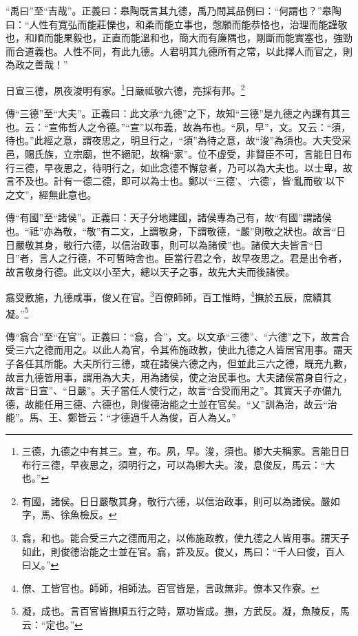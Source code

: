 {\noindent\shu{}\fzkt “禹曰”至“吉哉”。正義曰：皋陶既言其九德，禹乃問其品例曰：“何謂也？”皋陶曰：“人性有寬弘而能莊慄也，和柔而能立事也，愨願而能恭恪也，治理而能謹敬也，和順而能果毅也，正直而能溫和也，簡大而有廉隅也，剛斷而能實塞也，強勁而合道義也。人性不同，有此九德。人君明其九德所有之常，以此擇人而官之，則為政之善哉！” \par}

日宣三德，夙夜浚明有家。\footnote{三德，九德之中有其三。宣，布。夙，早。浚，須也。卿大夫稱家。言能日日布行三德，早夜思之，須明行之，可以為卿大夫。浚，息俊反，馬云：“大也。”}日嚴祗敬六德，亮採有邦。\footnote{有國，諸侯。日日嚴敬其身，敬行六德，以信治政事，則可以為諸侯。嚴如字，馬、徐魚檢反。}


{\noindent\zhuan{}\fzbyks 傳“三德”至“大夫”。正義曰：此文承“九德”之下，故知“三德”是九德之內課有其三也。云：“宣佈哲人之令德。”“宣”以布義，故為布也。“夙，早”，文。又云：“須，待也。”此經之意，謂夜思之，明旦行之，“須”為待之意，故“浚”為須也。大夫受采邑，賜氏族，立宗廟，世不絕祀，故稱“家”。位不虛受，非賢臣不可，言能日日布行三德，早夜思之，待明行之，如此念德不懈怠者，乃可以為大夫也。以士卑，故言不及也。計有一德二德，即可以為士也。鄭以“‘三德’、‘六德’，皆‘亂而敬’以下之文”，經無此意也。 \par}

{\noindent\zhuan{}\fzbyks 傳“有國”至“諸侯”。正義曰：天子分地建國，諸侯專為己有，故“有國”謂諸侯也。“祗”亦為敬，“敬”有二文，上謂敬身，下謂敬德，“嚴”則敬之狀也。故言“日日嚴敬其身，敬行六德，以信治政事，則可以為諸侯”也。諸侯大夫皆言“日日”者，言人之行德，不可暫時舍也。臣當行君之令，故早夜思之。君是出令者，故言敬身行德。此文以小至大，總以天子之事，故先大夫而後諸侯。 \par}

翕受敷施，九德咸事，俊乂在官。\footnote{翕，和也。能合受三六之德而用之，以佈施政教，使九德之人皆用事。謂天子如此，則俊德治能之士並在官。翕，許及反。俊乂，馬曰：“千人曰俊，百人曰乂。”}百僚師師，百工惟時，\footnote{僚、工皆官也。師師，相師法。百官皆是，言政無非。僚本又作寮。}撫於五辰，庶績其凝。”\footnote{凝，成也。言百官皆撫順五行之時，眾功皆成。撫，方武反。凝，魚陵反，馬云：“定也。”}

{\noindent\zhuan{}\fzbyks 傳“翕合”至“在官”。正義曰：“翕，合”，文。以文承“三德”、“六德”之下，故言合受三六之德而用之。以此人為官，令其佈施政教，使此九德之人皆居官用事。謂天子各任其所能。大夫所行三德，或在諸侯六德之內，但並此三六之德，既充九數，故言九德皆用事，謂用為大夫，用為諸侯，使之治民事也。大夫諸侯當身自行之，故言“日宣”、“日嚴”。天子當任人使行之，故言“合受而用之”。其實天子亦備九德，故能任用三德、六德也，則俊德治能之士並在官矣。“乂”訓為治，故云“治能”。馬、王、鄭皆云：“才德過千人為俊，百人為乂。” \par}

